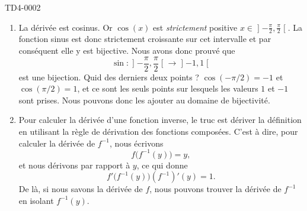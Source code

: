 
\begin{corrige}{TD4-0002}

	\begin{enumerate}
		\item
            La dérivée est cosinus. Or $\cos(x)$ est \emph{strictement} positive $x\in\mathopen] -\frac{ \pi }{2} , \frac{ \pi }{2} \mathclose[$. La fonction sinus est donc strictement croissante sur cet intervalle et par conséquent elle y est bijective. Nous avons donc prouvé que 
            \begin{equation}
                \sin\colon \mathopen] -\frac{ \pi }{2} , \frac{ \pi }{2} \mathclose[\to \mathopen] -1 , 1 \mathclose[ 
            \end{equation}
            est une bijection. Quid des derniers deux points ? \( \cos(-\pi/2)=-1\) et \( \cos(\pi/2)=1\), et ce sont les seuls points sur lesquels les valeurs \( 1\) et \( -1\) sont prises. Nous pouvons donc les ajouter au domaine de bijectivité.
		\item
			Pour calculer la dérivée d'une fonction inverse, le truc est dériver la définition en utilisant la règle de dérivation des fonctions composées. C'est à dire, pour calculer la dérivée de $f^{-1}$, nous écrivons
			\begin{equation}
				f\big( f^{-1}(y) \big)=y,
			\end{equation}
			et nous dérivons par rapport à $y$, ce qui donne
			\begin{equation}
				f'\big( f^{-1}(y) \big)(f^{-1})'(y)=1.
			\end{equation}
			De là, si nous savons la dérivée de $f$, nous pouvons trouver la dérivée de $f^{-1}$ en isolant $f^{-1}(y)$. 


\end{enumerate}
\end{corrige}
